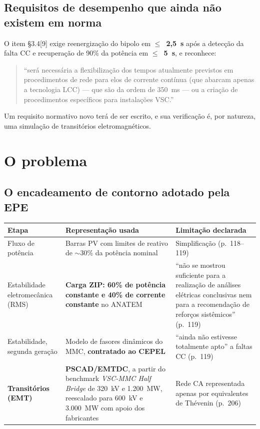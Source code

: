 \documentclass[12pt,a4paper]{article}
\newenvironment{citacao}
  {\begin{quote}\singlespacing\small\setlength{\leftskip}{2.5cm}\noindent}
  {\par\end{quote}}
\newcommand{\fonte}[1]{\par\vspace{2pt}\noindent{\footnotesize\textcolor{gray}{#1}}}
\begin{document}
\subsection{Requisitos de desempenho que ainda não existem em norma}

O item \S3.4[9] exige reenergização do bipolo em \textbf{$\leq$~2,5~s} após a detecção da falta CC e
recuperação de 90\% da potência em \textbf{$\leq$~5~s}, e reconhece:

\begin{citacao}
\enquote{será necessária a flexibilização dos tempos atualmente previstos em procedimentos de rede
para elos de corrente contínua (que abarcam apenas a tecnologia LCC) --- que são da ordem de
350~ms --- ou a criação de procedimentos específicos para instalações VSC.}
\fonte{EPE-DEE-RE-071/2025-rev0, p.~43.}
\end{citacao}

Um requisito normativo novo terá de ser escrito, e sua verificação é, por natureza, uma simulação
de transitórios eletromagnéticos.

\section{O problema}

\subsection{O encadeamento de contorno adotado pela EPE}

\begin{center}
\small
\begin{tabularx}{\textwidth}{@{}p{3.1cm}p{4.4cm}X@{}}
\toprule
\textbf{Etapa} & \textbf{Representação usada} & \textbf{Limitação declarada} \\
\midrule
Fluxo de potência &
Barras PV com limites de reativo de $\sim$30\% da potência nominal &
Simplificação (p.~118--119) \\
Estabilidade eletromecânica (RMS) &
\textbf{Carga ZIP: 60\% de potência constante e 40\% de corrente constante} no ANATEM &
\enquote{não se mostrou suficiente para a realização de análises elétricas conclusivas nem para a
recomendação de reforços sistêmicos} (p.~119) \\
Estabilidade, segunda geração &
Modelo de fasores dinâmicos do MMC, \textbf{contratado ao CEPEL} &
\enquote{ainda não estivesse totalmente apto} a faltas CC (p.~119) \\
\textbf{Transitórios (EMT)} &
\textbf{PSCAD/EMTDC}, a partir do benchmark \emph{VSC-MMC Half Bridge} de 320~kV e 1.200~MW,
reescalado para 600~kV e 3.000~MW com apoio dos fabricantes &
Rede CA representada apenas por equivalentes de Thévenin (p.~206) \\
\bottomrule
\end{tabularx}
\end{center}
\end{document}
